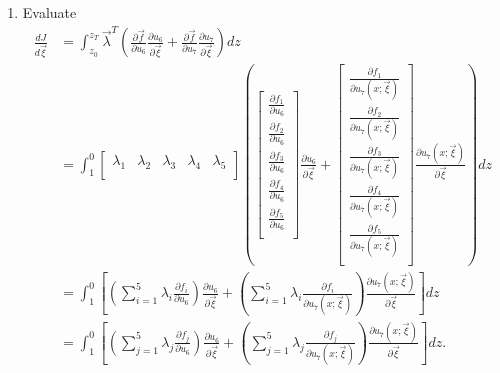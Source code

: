 \documentclass[11pt]{article}
\begin{document}
\begin{enumerate}
	\item Evaluate 
	\begin{equation}
		\begin{split}
			\frac{{dJ}}{{d\vec \xi }} & = \int_{{z_0}}^{{z_T}} {{{\vec \lambda }^T}\left( {\frac{{\partial \vec f}}{{\partial {u_6}}}\frac{{\partial {u_6}}}{{\partial \vec \xi }} + \frac{{\partial \vec f}}{{\partial {u_7}}}\frac{{\partial {u_7}}}{{\partial \vec \xi }}} \right)dz} \\
			& = \int_1^0 {\left[ {\begin{matrix}
						{{\lambda _1}} & {{\lambda _2}} & {{\lambda _3}} & {{\lambda _4}} & {{\lambda _5}} \\ 
				\end{matrix} } \right]\left( {\left[ {\begin{matrix}
							{\frac{{\partial {f_1}}}{{\partial {u_6}}}}  \\ 
							{\frac{{\partial {f_2}}}{{\partial {u_6}}}}  \\ 
							{\frac{{\partial {f_3}}}{{\partial {u_6}}}}  \\ 
							{\frac{{\partial {f_4}}}{{\partial {u_6}}}}  \\ 
							{\frac{{\partial {f_5}}}{{\partial {u_6}}}}  \\ 
					\end{matrix} } \right]\frac{{\partial {u_6}}}{{\partial \vec \xi }} + \left[ {\begin{matrix}
					{\frac{{\partial {f_1}}}{{\partial {u_7}\left( {x;\vec \xi } \right)}}}  \\ 
					{\frac{{\partial {f_2}}}{{\partial {u_7}\left( {x;\vec \xi } \right)}}}  \\ 
					{\frac{{\partial {f_3}}}{{\partial {u_7}\left( {x;\vec \xi } \right)}}}  \\ 
					{\frac{{\partial {f_4}}}{{\partial {u_7}\left( {x;\vec \xi } \right)}}}  \\ 
					{\frac{{\partial {f_5}}}{{\partial {u_7}\left( {x;\vec \xi } \right)}}}  \\ 
					\end{matrix} } \right]\frac{{\partial {u_7}\left( {x;\vec \xi } \right)}}{{\partial \vec \xi }}} \right)dz} \\
			& = \int_1^0 {\left[ {\left( {\sum\limits_{i = 1}^5 {{\lambda _i}\frac{{\partial {f_i}}}{{\partial {u_6}}}} } \right)\frac{{\partial {u_6}}}{{\partial \vec \xi }} + \left( {\sum\limits_{i = 1}^5 {{\lambda _i}\frac{{\partial {f_i}}}{{\partial {u_7}\left( {x;\vec \xi } \right)}}} } \right)\frac{{\partial {u_7}\left( {x;\vec \xi } \right)}}{{\partial \vec \xi }}} \right]dz} \\
			& = \int_1^0 {\left[ {\left( {\sum\limits_{j = 1}^5 {{\lambda _j}\frac{{\partial {f_j}}}{{\partial {u_6}}}} } \right)\frac{{\partial {u_6}}}{{\partial \vec \xi }} + \left( {\sum\limits_{j = 1}^5 {{\lambda _j}\frac{{\partial {f_j}}}{{\partial {u_7}\left( {x;\vec \xi } \right)}}} } \right)\frac{{\partial {u_7}\left( {x;\vec \xi } \right)}}{{\partial \vec \xi }}} \right]dz} .
		\end{split}
		\label{eq0013} 
	\end{equation}
\end{enumerate}
\end{document}
